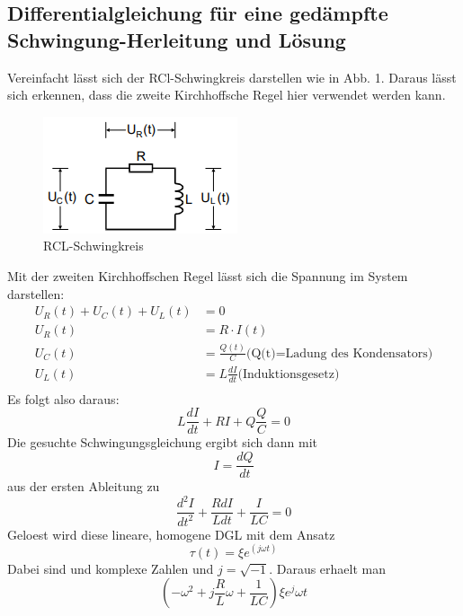 \documentclass[titlepage=firstcover, captions=tableheading]{scrartcl}
\begin{document}
\subsection{Differentialgleichung für eine gedämpfte Schwingung-Herleitung und Lösung}
Vereinfacht lässt sich der RCl-Schwingkreis darstellen wie in Abb. 1. Daraus lässt sich erkennen, dass die zweite Kirchhoffsche Regel hier verwendet werden kann.
\begin{figure}[H]
    \centering
    \includegraphics{"Schaltkreis_RCL.png"}
    \caption{RCL-Schwingkreis}
\end{figure}
Mit der zweiten Kirchhoffschen Regel lässt sich die Spannung im System darstellen:
\begin{align}
    U_R(t)+U_C(t)+U_L(t)&=0\nonumber\\
    U_R(t)&=R\cdot I(t)\nonumber\\
    U_C(t)&=\frac{Q(t)}{C} \text{(Q(t)=Ladung des Kondensators)}\nonumber\\
    U_L(t)&=L\frac{dI}{dt} \text{(Induktionsgesetz)}\nonumber\\\nonumber
\end{align}
Es folgt also daraus:
\begin{equation}
  L\frac{dI}{dt}+RI+Q\frac{Q}{C}=0  \nonumber
\end{equation}
Die gesuchte Schwingungsgleichung ergibt sich dann mit 
\begin{equation}
    I=\frac{dQ}{dt}\nonumber
\end{equation}
aus der ersten Ableitung zu 
\begin{equation} \label{DGL}
    \frac{d^2I}{dt^2}+\frac{RdI}{Ldt}+\frac{I}{LC}=0
\end{equation}
Geloest wird diese lineare, homogene DGL mit dem Ansatz 
\begin{equation}
    \tau(t)=\xi e^(j\omega t)\nonumber
\end{equation}
Dabei sind \xi und \omega komplexe Zahlen und $j=\sqrt{-1}$.
Daraus erhaelt man 
\begin{equation}
    (-\omega^2+j\frac{R}{L}\omega+\frac{1}{LC})\xi e^j\omega t \nonumber
\end{equation}
\end{document}
